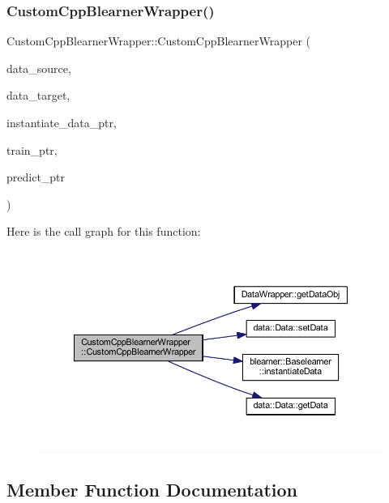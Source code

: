 \subsubsection{\texorpdfstring{Custom\+Cpp\+Blearner\+Wrapper()}{CustomCppBlearnerWrapper()}}
{\footnotesize\ttfamily Custom\+Cpp\+Blearner\+Wrapper\+::\+Custom\+Cpp\+Blearner\+Wrapper (\begin{DoxyParamCaption}\item[{\mbox{\hyperlink{class_data_wrapper}{Data\+Wrapper}} \&}]{data\+\_\+source,  }\item[{\mbox{\hyperlink{class_data_wrapper}{Data\+Wrapper}} \&}]{data\+\_\+target,  }\item[{S\+E\+XP}]{instantiate\+\_\+data\+\_\+ptr,  }\item[{S\+E\+XP}]{train\+\_\+ptr,  }\item[{S\+E\+XP}]{predict\+\_\+ptr }\end{DoxyParamCaption})\hspace{0.3cm}{\ttfamily [inline]}}

Here is the call graph for this function\+:
\nopagebreak
\begin{figure}[H]
\begin{center}
\leavevmode
\includegraphics[width=350pt]{class_custom_cpp_blearner_wrapper_af5083cc4ff105d0818b7443f228d09ab_cgraph}
\end{center}
\end{figure}


\subsection{Member Function Documentation}
\mbox{\label{class_custom_cpp_blearner_wrapper_a015410ca4260c3e5586ab7923ef2d624}} 

